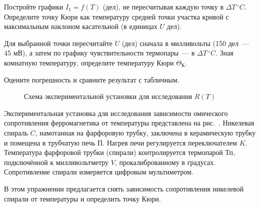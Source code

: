 \begin{lab:task}

\item
  Постройте графики $I_1 = f(T)$ (дел), не пересчитывая каждую точку в $\Delta
T\,^{\circ} C$. Определите точку Кюри как температуру средней точки участка
кривой с максимальным наклоном касательной (в единицах $U$ дел).

Для выбранной точки пересчитайте $U$ (дел) сначала в милливольты (150 дел~---
45 мВ), а затем по графику чувствительности термопары~--- в  $\Delta
T\,^{\circ} C$. Зная комнатную температуру, определите температуру Кюри
$\Theta_{К}$.


\item
  Оцените погрешность и сравните результат с табличным.

\end{lab:task}


\experiment

\begin{figure}[h!]
\centering
	\caption{Схема экспериментальной установки для исследования $R(T)$}
\end{figure}
Экспериментальная установка для исследования зависимости омического
сопротивления ферромагнетика от температуры представлена на
рис.~. Никелевая спираль $C$,
намотанная на фарфоровую трубку, заключена в керамическую трубку и помещена в
трубчатую печь $\text{П}$. Нагрев печи регулируется переключателем $K$.
Температура фарфоровой трубки (спирали) контролируется термопарой $\text{Тп}$,
подключённой к милливольтметру $V$, прокалиброванному в градусах. Сопротивление
спирали измеряется цифровым мультиметром.


\labtask


В этом упражнении предлагается снять зависимость сопротивления никелевой
спирали от температуры и определить точку Кюри.

